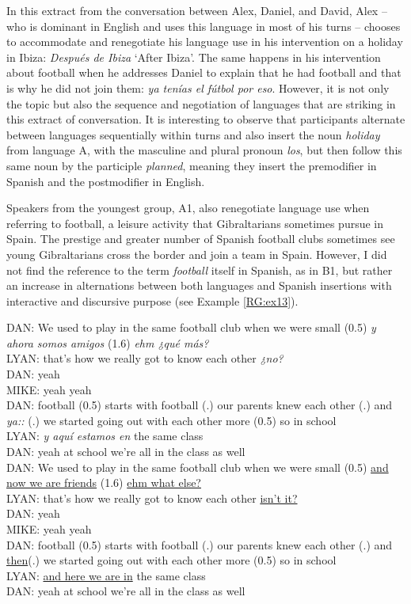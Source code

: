 \documentclass[output=paper]{langscibook}
\begin{document}
In this extract from the conversation between Alex, Daniel, and David, Alex – who is dominant in English and uses this language in most of his turns – chooses to accommodate and renegotiate his language use in his intervention on a holiday in Ibiza: \textit{Después de Ibiza} ‘After Ibiza’. The same happens in his intervention about football when he addresses Daniel to explain that he had football and that is why he did not join them: \textit{ya tenías el fútbol por eso}. However, it is not only the topic but also the sequence and negotiation of languages that are striking in this extract of conversation. It is interesting to observe that participants alternate between languages sequentially within turns and also insert the noun \textit{holiday} from language A, with the masculine and plural pronoun \textit{los}, but then follow this same noun by the participle \textit{planned}, meaning they insert the premodifier in Spanish and the postmodifier in English.

Speakers from the youngest group, A1, also renegotiate language use when referring to football, a leisure activity that Gibraltarians sometimes pursue in Spain. The prestige and greater number of Spanish football clubs sometimes see young Gibraltarians cross the border and join a team in Spain. However, I did not find the reference to the term \textit{football} itself in Spanish, as in B1, but rather an increase in alternations between both languages and Spanish insertions with interactive and discursive purpose (see Example \ref{RG:ex13}). 

\begin{exe}\ex\label{RG:ex13}
DAN:  We used to play in the same football club when we were small (0.5) \textit{y ahora somos amigos} (1.6) \textit{ehm ¿qué más? }\\
LYAN: that’s how we really got to know each other \textit{¿no?} \\
DAN: yeah\\
MIKE: yeah yeah\\
DAN: football (0.5) starts with football (.) our parents knew each other (.) and \textit{ya:: }(.) we started going out with each other more (0.5) so in school\\
LYAN: \textit{y aquí estamos en} the same class\\
DAN: yeah at school we’re all in the class as well\\

DAN: We used to play in the same football club when we were small (0.5) \ul{and now we are friends} (1.6) \ul{ehm what else?}\\
LYAN: that’s how we really got to know each other \ul{isn’t it?}\\
DAN: yeah\\
MIKE: yeah yeah\\
DAN: football (0.5) starts with football (.) our parents knew each other (.) and \ul{then}(.) we started going out with each other more (0.5) so in school\\
LYAN: \ul{and here we are in} the same class\\
DAN: yeah at school we’re all in the class as well
\end{exe}
\end{document}
